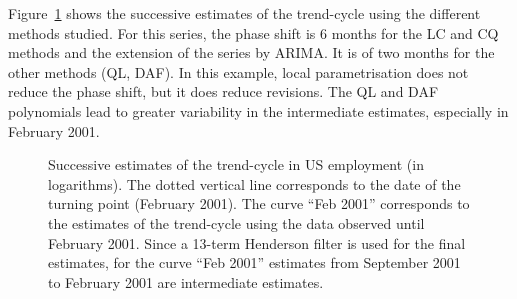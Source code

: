\documentclass[
]{article}
\newcommand\1{\mathds{1}}
\begin{document}
Figure~\ref{fig-ce16ovlp} shows the successive estimates of the
trend-cycle using the different methods studied. For this series, the
phase shift is 6 months for the LC and CQ methods and the extension of
the series by ARIMA. It is of two months for the other methods (QL,
DAF). In this example, local parametrisation does not reduce the phase
shift, but it does reduce revisions. The QL and DAF polynomials lead to
greater variability in the intermediate estimates, especially in
February 2001.

\begin{figure}[H]

\caption{\label{fig-ce16ovlp}Successive estimates of the trend-cycle in
US employment (in logarithms). The dotted vertical line corresponds to
the date of the turning point (February 2001). The curve ``Feb 2001''
corresponds to the estimates of the trend-cycle using the data observed
until February 2001. Since a 13-term Henderson filter is used for the
final estimates, for the curve ``Feb 2001'' estimates from September
2001 to February 2001 are intermediate estimates.}


\end{figure}%
\end{document}
